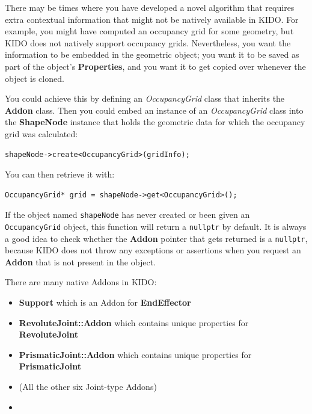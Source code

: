 There may be times where you have developed a novel algorithm that requires extra contextual information that might not be natively available in KIDO. For example, you might have computed an occupancy grid for some geometry, but KIDO does not natively support occupancy grids. Nevertheless, you want the information to be embedded in the geometric object; you want it to be saved as part of the object's \textbf{Properties}, and you want it to get copied over whenever the object is cloned.

You could achieve this by defining an \textit{OccupancyGrid} class that inherits the \textbf{Addon} class. Then you could embed an instance of an \textit{OccupancyGrid} class into the \textbf{ShapeNode} instance that holds the geometric data for which the occupancy grid was calculated:

\begin{lstlisting}
shapeNode->create<OccupancyGrid>(gridInfo);
\end{lstlisting}

You can then retrieve it with:

\begin{lstlisting}
OccupancyGrid* grid = shapeNode->get<OccupancyGrid>();
\end{lstlisting}

If the object named \texttt{shapeNode} has never created or been given an \texttt{OccupancyGrid} object, this function will return a \texttt{nullptr} by default. It is always a good idea to check whether the \textbf{Addon} pointer that gets returned is a \texttt{nullptr}, because KIDO does not throw any exceptions or assertions when you request an \textbf{Addon} that is not present in the object.

There are many native Addons in KIDO:

\begin{itemize}
  \item \textbf{Support} which is an Addon for \textbf{EndEffector}
  \item \textbf{RevoluteJoint::Addon} which contains unique properties for \textbf{RevoluteJoint}
  \item \textbf{PrismaticJoint::Addon} which contains unique properties for \textbf{PrismaticJoint}
  \item (All the other six Joint-type Addons)
  \item {}
\end{itemize}

